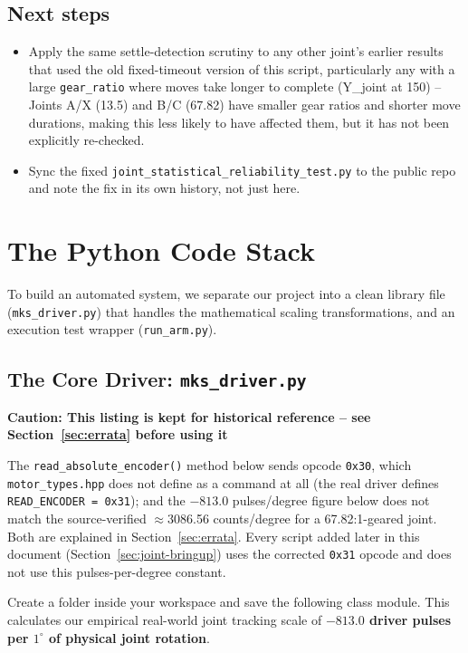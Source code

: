 \documentclass[11pt,letterpaper]{article}
\newenvironment{caution}[1]{%
    \par\addvspace{8pt}%
    \noindent{\color{cautionred}\rule{\linewidth}{0.8pt}}\par\vspace{2pt}
    \noindent\textbf{\color{cautionred}Caution: #1}\par\vspace{2pt}
}{%
    \par\vspace{2pt}\noindent{\color{cautionred}\rule{\linewidth}{0.4pt}}%
    \par\addvspace{8pt}%
}
\begin{document}
\subsection{Next steps}
\begin{itemize}
    \item Apply the same settle-detection scrutiny to any other joint's earlier results that used the old fixed-timeout version of this script, particularly any with a large \texttt{gear\_ratio} where moves take longer to complete (Y\_joint at 150) -- Joints A/X (13.5) and B/C (67.82) have smaller gear ratios and shorter move durations, making this less likely to have affected them, but it has not been explicitly re-checked.
    \item Sync the fixed \texttt{joint\_statistical\_reliability\_test.py} to the public repo and note the fix in its own history, not just here.
\end{itemize}

\section{The Python Code Stack}
To build an automated system, we separate our project into a clean library file (\texttt{mks\_driver.py}) that handles the mathematical scaling transformations, and an execution test wrapper (\texttt{run\_arm.py}).

\subsection{The Core Driver: \texttt{mks\_driver.py}}
\begin{caution}{This listing is kept for historical reference -- see Section~\ref{sec:errata} before using it}
The \texttt{read\_absolute\_encoder()} method below sends opcode \texttt{0x30}, which \texttt{motor\_types.hpp} does not define as a command at all (the real driver defines \texttt{READ\_ENCODER = 0x31}); and the $-813.0$ pulses/degree figure below does not match the source-verified $\approx$3086.56 counts/degree for a 67.82:1-geared joint. Both are explained in Section~\ref{sec:errata}. Every script added later in this document (Section~\ref{sec:joint-bringup}) uses the corrected \texttt{0x31} opcode and does not use this pulses-per-degree constant.
\end{caution}
Create a folder inside your workspace and save the following class module. This calculates our empirical real-world joint tracking scale of \textbf{$-813.0$ driver pulses per $1^\circ$ of physical joint rotation}.
\end{document}

